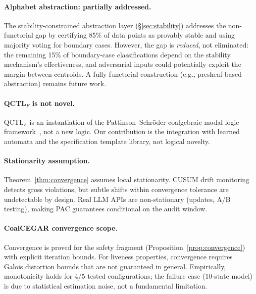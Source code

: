 \documentclass[11pt]{article}
\newcommand{\qctlf}{QCTL$_F$}
\begin{document}
\paragraph{Alphabet abstraction: partially addressed.}
The stability-constrained abstraction layer (\S\ref{sec:stability})
addresses the non-functorial gap by certifying 85\% of data points
as provably stable and using majority voting for boundary cases.
However, the gap is \emph{reduced}, not eliminated: the remaining
15\% of boundary-case classifications depend on the stability
mechanism's effectiveness, and adversarial inputs could potentially
exploit the margin between centroids.  A fully functorial
construction (e.g., presheaf-based abstraction) remains future work.

\paragraph{QCTL$_F$ is not novel.}
\qctlf{} is an instantiation of the Pattinson--Schr\"oder coalgebraic
modal logic framework~\cite{pattinson2008coalgebraic}, not a new
logic.  Our contribution is the integration with learned automata
and the specification template library, not logical novelty.

\paragraph{Stationarity assumption.}
Theorem~\ref{thm:convergence} assumes local stationarity.  CUSUM
drift monitoring detects gross violations, but subtle shifts within
convergence tolerance are undetectable by design.  Real LLM APIs
are non-stationary (updates, A/B testing), making PAC guarantees
conditional on the audit window.

\paragraph{CoalCEGAR convergence scope.}
Convergence is proved for the safety fragment
(Proposition~\ref{prop:convergence}) with explicit iteration bounds.
For liveness properties, convergence requires Galois distortion
bounds that are not guaranteed in general.  Empirically, monotonicity
holds for 4/5 tested configurations; the failure case (10-state model)
is due to statistical estimation noise, not a fundamental limitation.
\end{document}

